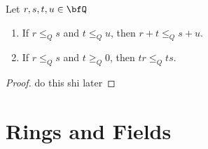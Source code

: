     \begin{proposition}
        Let $r,s,t,u \in \bfQ$
        \begin{enumerate}[label = (\arabic*)]
            \item If $r \leq_Q s$ and $t \leq_Q u$, then $r+ t \leq_Q s+ u$.
            \item If $r \leq_Q s$ and $t \geq_Q 0$, then $tr \leq_Q ts$.
        \end{enumerate}
    \end{proposition}
        \begin{proof}
            {\color{red} do this shi later}
        \end{proof}
    
\section{Rings and Fields}
